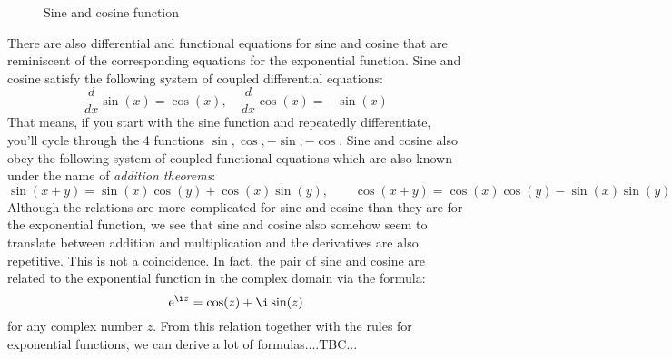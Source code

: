 \begin{figure}[h]
\centering
\caption{Sine and cosine function}
\label{Fig:SineAndCosine}
\end{figure}
There are also differential and functional equations for sine and cosine that are reminiscent of the corresponding equations for the exponential function. Sine and cosine satisfy the following system of coupled differential equations:
\begin{equation}
\frac{d}{dx} \sin(x) = \cos(x), \quad
\frac{d}{dx} \cos(x) = -\sin(x)
\end{equation}
That means, if you start with the sine function and repeatedly differentiate, you'll cycle through the 4 functions $\sin, \cos, -\sin, -\cos$. Sine and cosine also obey the following system of coupled functional equations which are also known under the name of \emph{addition theorems}:
\begin{equation}
\sin(x+y) = \sin(x) \cos(y) + \cos(x) \sin(y), \qquad
\cos(x+y) = \cos(x) \cos(y) - \sin(x) \sin(y)
\end{equation}
Although the relations are more complicated for sine and cosine than they are for the exponential function, we see that sine and cosine also somehow seem to translate between addition and multiplication and the derivatives are also repetitive. This is not a coincidence. In fact, the pair of sine and cosine are related to the exponential function in the complex domain via the formula:
\begin{equation}
\e^{\i z} = \cos(z) + \i \sin(z)
\end{equation}
for any complex number $z$. From this relation together with the rules for exponential functions, we can derive a lot of formulas....TBC...






